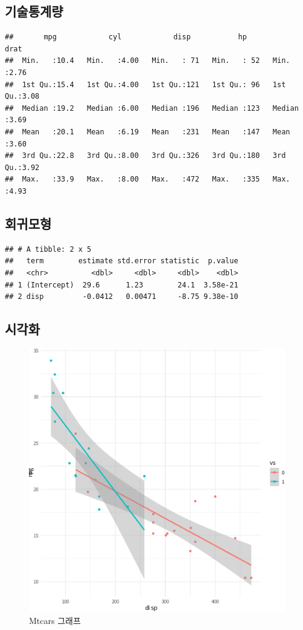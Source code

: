 \documentclass[12pt,]{article}
\begin{document}
\subsection{기술통계량}

\begin{verbatim}
##       mpg            cyl            disp           hp           drat     
##  Min.   :10.4   Min.   :4.00   Min.   : 71   Min.   : 52   Min.   :2.76  
##  1st Qu.:15.4   1st Qu.:4.00   1st Qu.:121   1st Qu.: 96   1st Qu.:3.08  
##  Median :19.2   Median :6.00   Median :196   Median :123   Median :3.69  
##  Mean   :20.1   Mean   :6.19   Mean   :231   Mean   :147   Mean   :3.60  
##  3rd Qu.:22.8   3rd Qu.:8.00   3rd Qu.:326   3rd Qu.:180   3rd Qu.:3.92  
##  Max.   :33.9   Max.   :8.00   Max.   :472   Max.   :335   Max.   :4.93
\end{verbatim}

\subsection{회귀모형}

\begin{verbatim}
## # A tibble: 2 x 5
##   term        estimate std.error statistic  p.value
##   <chr>          <dbl>     <dbl>     <dbl>    <dbl>
## 1 (Intercept)  29.6      1.23        24.1  3.58e-21
## 2 disp         -0.0412   0.00471     -8.75 9.38e-10
\end{verbatim}

\subsection{시각화}

\begin{figure}

{\centering \includegraphics{ms_files/figure-latex/mtcarsGraph-1} 

}

\caption{Mtcars 그래프}\label{fig:mtcarsGraph}
\end{figure}
\end{document}
